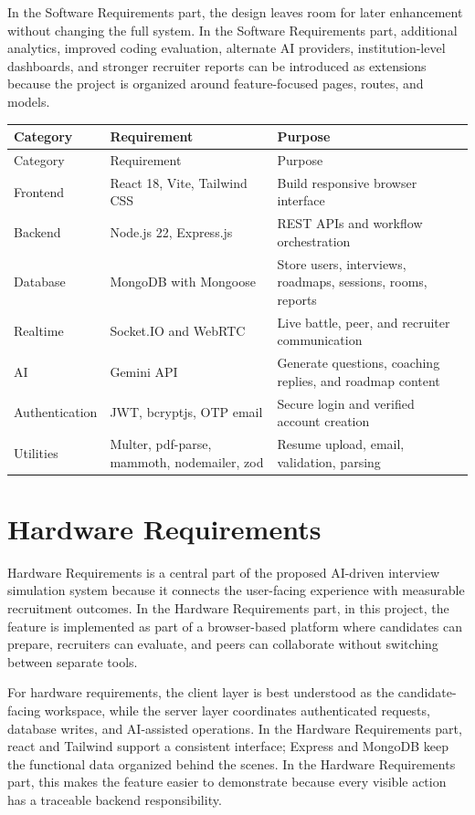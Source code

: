 \documentclass[12pt,a4paper]{report}
\begin{document}
In the Software Requirements part, the design leaves room for later enhancement without changing the full system. In the Software Requirements part, additional analytics, improved coding evaluation, alternate AI providers, institution-level dashboards, and stronger recruiter reports can be introduced as extensions because the project is organized around feature-focused pages, routes, and models.


\begin{longtable}{|>{\raggedright\arraybackslash}p{}|>{\raggedright\arraybackslash}p{}|>{\raggedright\arraybackslash}p{}|}
\hline
Category & Requirement & Purpose \\
\hline
\endfirsthead
\hline
Category & Requirement & Purpose \\
\hline
\endhead
Frontend & React 18, Vite, Tailwind CSS & Build responsive browser interface \\
\hline
Backend & Node.js 22, Express.js & REST APIs and workflow orchestration \\
\hline
Database & MongoDB with Mongoose & Store users, interviews, roadmaps, sessions, rooms, reports \\
\hline
Realtime & Socket.IO and WebRTC & Live battle, peer, and recruiter communication \\
\hline
AI & Gemini API & Generate questions, coaching replies, and roadmap content \\
\hline
Authentication & JWT, bcryptjs, OTP email & Secure login and verified account creation \\
\hline
Utilities & Multer, pdf-parse, mammoth, nodemailer, zod & Resume upload, email, validation, parsing \\
\hline
\end{longtable}

\section{Hardware Requirements}

Hardware Requirements is a central part of the proposed AI-driven interview simulation system because it connects the user-facing experience with measurable recruitment outcomes. In the Hardware Requirements part, in this project, the feature is implemented as part of a browser-based platform where candidates can prepare, recruiters can evaluate, and peers can collaborate without switching between separate tools.


For hardware requirements, the client layer is best understood as the candidate-facing workspace, while the server layer coordinates authenticated requests, database writes, and AI-assisted operations. In the Hardware Requirements part, react and Tailwind support a consistent interface; Express and MongoDB keep the functional data organized behind the scenes. In the Hardware Requirements part, this makes the feature easier to demonstrate because every visible action has a traceable backend responsibility.
\end{document}
